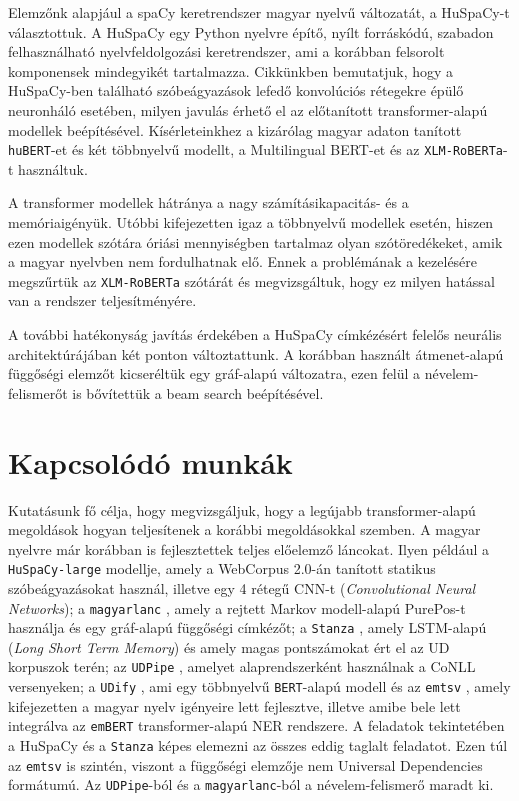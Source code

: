 \documentclass{llncs}
\newcommand{\embert}{\texttt{emBERT}}
\newcommand{\emtsv}{\texttt{emtsv}}
\newcommand{\hubert}{\texttt{huBERT}}
\newcommand{\huspacyl}{\texttt{HuSpaCy-large}}
\newcommand{\roberta}{\texttt{XLM-RoBERTa}}
\newcommand{\magyarlanc}{\texttt{magyarlanc}}
\newcommand{\bert}{\texttt{BERT}}
\newcommand{\udpipe}{\texttt{UDPipe}}
\newcommand{\stanza}{\texttt{Stanza}}
\newcommand{\udify}{\texttt{UDify}}
\newcommand{\ud}{Universal Dependencies}
\newcommand{\spacy}{spaCy}
\newcommand{\huspacy}{HuSpaCy}
\newcommand{\trf}{transformer}
\begin{document}
Elemzőnk alapjául a \spacy{} \citep{spacy} keretrendszer magyar nyelvű változatát, a \huspacy{}-t \citep{huspacy} választottuk. A \huspacy{} egy Python nyelvre építő, nyílt forráskódú, szabadon felhasználható nyelvfeldolgozási keretrendszer, ami a korábban felsorolt komponensek mindegyikét tartalmazza. Cikkünkben bemutatjuk, hogy a \huspacy{}-ben található szóbeágyazások lefedő konvolúciós rétegekre épülő neuronháló esetében, milyen javulás érhető el az előtanított \trf{}-alapú modellek beépítésével. Kísérleteinkhez a kizárólag magyar adaton tanított \hubert{}-et \citep{Nemeskey:2021a} és két többnyelvű modellt, a Multilingual BERT-et \citep{pires2019multilingual} és az \roberta{}-t \citep{conneau2019unsupervised} használtuk.

A \trf{} modellek hátránya a nagy számításikapacitás- és a memóriaigényük. Utóbbi kifejezetten igaz a többnyelvű modellek esetén, hiszen ezen modellek szótára óriási mennyiségben tartalmaz olyan szótöredékeket, amik a magyar nyelvben nem fordulhatnak elő. Ennek a problémának a kezelésére megszűrtük az \roberta{} szótárát és megvizsgáltuk, hogy ez milyen hatással van a rendszer teljesítményére.

A további hatékonyság javítás érdekében a \huspacy{} címkézésért felelős neurális architektúrájában két ponton változtattunk. A korábban használt átmenet-alapú függőségi elemzőt kicseréltük egy gráf-alapú változatra, ezen felül a névelem-felismerőt is bővítettük a beam search \citep{beam} beépítésével.


\section{Kapcsolódó munkák}

Kutatásunk fő célja, hogy megvizsgáljuk, hogy a legújabb \trf{}-alapú megoldások hogyan teljesítenek a korábbi megoldásokkal szemben. A magyar nyelvre már korábban is fejlesztettek teljes előelemző láncokat. Ilyen például a \huspacyl{} \citep{huspacy} modellje, amely a WebCorpus 2.0-án \citep{Nemeskey:2020} tanított statikus szóbeágyazásokat használ, illetve egy 4 rétegű CNN-t (\emph{Convolutional Neural Networks}); a \magyarlanc{} \citep{magyarlanc}, amely a rejtett Markov modell-alapú PurePos-t \citep{orosz2013purepos} használja és egy gráf-alapú függőségi címkézőt; a \stanza{} \citep{qi2020stanza}, amely LSTM-alapú (\emph{Long Short Term Memory}) és amely magas pontszámokat ért el az UD korpuszok terén; az \udpipe{} \citep{udpipe}, amelyet alaprendszerként használnak a CoNLL versenyeken; a \udify{} \citep{udify}, ami egy többnyelvű \bert{}-alapú modell és az \emtsv{} \citep{emtsv1, emtsv2, emtsv3, emtsv4, emtsv5}, amely kifejezetten a magyar nyelv igényeire lett fejlesztve, illetve amibe bele lett integrálva az \embert{} \citep{nemeskey2020embert} \trf{}-alapú NER rendszere. A feladatok tekintetében a \huspacy{} és a \stanza{} képes elemezni az összes eddig taglalt feladatot. Ezen túl az \emtsv{} is szintén, viszont a függőségi elemzője nem \ud{} formátumú. Az \udpipe{}-ból és a \magyarlanc{}-ból a névelem-felismerő maradt ki. 
\end{document}
